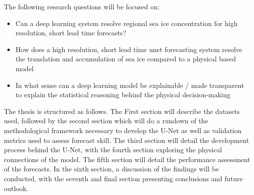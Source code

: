 \documentclass[../main/thesis.tex]{subfiles}
\begin{document}
The following research questions will be focused on: 
\begin{itemize}
    \item Can a deep learning system resolve regional sea ice concentration for high resolution, short lead time forecasts? 
    \item How does a high resolution, short lead time unet forecasting system resolve the translation and accumulation of sea ice compared to a physical based model
    \item  In what sense can a deep learning model be explainable / made transparent to explain the statistical reasoning behind the physical decision-making
\end{itemize}

The thesis is structured as follows. The First section will describe the datasets used, followed by the second section which will do a rundown of the methodological framework necessary to develop the U-Net as well as validation metrics used to assess forecast skill. The third section will detail the development process behind the U-Net, with the fourth section exploring the physical connections of the model. The fifth section will detail the performance assessment of the forecasts. In the sixth section, a discussion of the findings will be conducted, with the seventh and final section presenting conclusions and future outlook. 



\biblio
\end{document}
